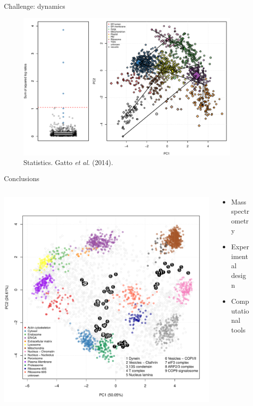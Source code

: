 \documentclass[presentation]{beamer}
\begin{document}
\begin{frame}{Challenge: dynamics}
  \begin{figure}[h]
    \centering
    \includegraphics[width=.9\linewidth]{./figures/transloc-dynamics2.pdf}
    \caption{Statistics. Gatto \textit{et al.} (2014). }
  \end{figure}
\end{frame}
 
\begin{frame}{Conclusions}
  \begin{columns}
    \begin{column}{.6\textwidth}
      \includegraphics[width=1\linewidth]{./figures/fusfoi.pdf}
    \end{column}
    \begin{column}{.4\textwidth}
      \begin{itemize}
      \item Mass spectrometry
      \item Experimental design
      \item Computational tools
      \end{itemize}
    \end{column}
  \end{columns}

\end{frame}
\end{document}
